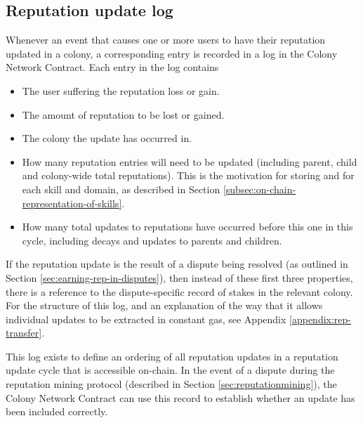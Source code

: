 \subsection{Reputation update log}\label{subsec:reputation-update-log}

Whenever an event that causes one or more users to have their reputation updated in a colony, a corresponding entry is recorded in a log in the Colony Network Contract. Each entry in the log contains

\begin{itemize}
\item The user suffering the reputation loss or gain.
\item The amount of reputation to be lost or gained.
\item The colony the update has occurred in.
\item How many reputation entries will need to be updated (including parent, child and colony-wide total reputations). This is the motivation for storing  and  for each skill and domain, as described in Section \ref{subsec:on-chain-representation-of-skills}.
\item How many total updates to reputations have occurred before this one in this cycle, including decays and updates to parents and children.
\end{itemize}

If the reputation update is the result of a dispute being resolved (as outlined in Section \ref{sec:earning-rep-in-disputes}), then instead of these first three properties, there is a reference to the dispute-specific record of stakes in the relevant colony. For the structure of this log, and an explanation of the way that it allows individual updates to be extracted in constant gas, see Appendix \ref{appendix:rep-transfer}.

This log exists to define an ordering of all reputation updates in a reputation update cycle that is accessible on-chain. In the event of a dispute during the reputation mining protocol (described in Section \ref{sec:reputationmining}), the Colony Network Contract can use this record to establish whether an update has been included correctly.
